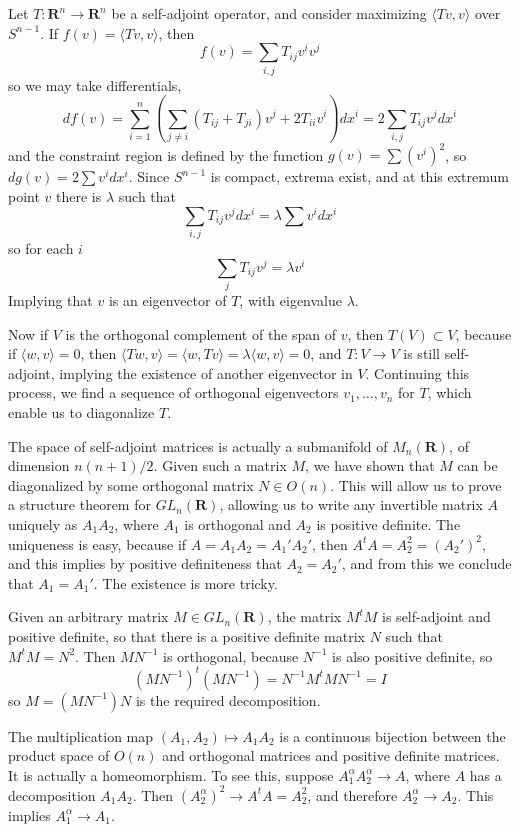 \begin{example}
    Let $T: \mathbf{R}^n \to \mathbf{R}^n$ be a self-adjoint operator, and consider maximizing $\langle Tv, v \rangle$ over $S^{n-1}$. If $f(v) = \langle Tv, v \rangle$, then
    \[ f(v) = \sum_{i,j} T_{ij} v^i v^j \]
    so we may take differentials,
    \[ df(v) = \sum_{i = 1}^n \left( \sum_{j \neq i} (T_{ij} + T_{ji}) v^j + 2 T_{ii} v^i \right) dx^i = 2 \sum_{i,j} T_{ij} v^j dx^i \]
    and the constraint region is defined by the function $g(v) = \sum (v^i)^2$, so $dg(v) = 2 \sum v^i dx^i$. Since $S^{n-1}$ is compact, extrema exist, and at this extremum point $v$ there is $\lambda$ such that
    \[ \sum_{i,j} T_{ij} v^j dx^i = \lambda \sum v^i dx^i \]
    so for each $i$
    \[ \sum_{j} T_{ij} v^j = \lambda v^i \]
    Implying that $v$ is an eigenvector of $T$, with eigenvalue $\lambda$.

    Now if $V$ is the orthogonal complement of the span of $v$, then $T(V) \subset V$, because if $\langle w, v \rangle = 0$, then $\langle Tw, v \rangle = \langle w, Tv \rangle = \lambda \langle w, v \rangle = 0$, and $T: V \to V$ is still self-adjoint, implying the existence of another eigenvector in $V$. Continuing this process, we find a sequence of orthogonal eigenvectors $v_1, \dots, v_n$ for $T$, which enable us to diagonalize $T$.

    The space of self-adjoint matrices is actually a submanifold of $M_n(\mathbf{R})$, of dimension $n(n+1)/2$. Given such a matrix $M$, we have shown that $M$ can be diagonalized by some orthogonal matrix $N \in O(n)$. This will allow us to prove a structure theorem for $GL_n(\mathbf{R})$, allowing us to write any invertible matrix $A$ uniquely as $A_1 A_2$, where $A_1$ is orthogonal and $A_2$ is positive definite. The uniqueness is easy, because if $A = A_1 A_2 = A_1' A_2'$, then $A^t A = A_2^2 = (A_2')^2$, and this implies by positive definiteness that $A_2 = A_2'$, and from this we conclude that $A_1 = A_1'$. The existence is more tricky.

    Given an arbitrary matrix $M \in GL_n(\mathbf{R})$, the matrix $M^t M$ is self-adjoint and positive definite, so that there is a positive definite matrix $N$ such that $M^t M = N^2$. Then $MN^{-1}$ is orthogonal, because $N^{-1}$ is also positive definite, so
    \[ (MN^{-1})^t (MN^{-1}) = N^{-1} M^t M N^{-1} = I \]
    so $M = (MN^{-1}) N$ is the required decomposition.

    The multiplication map $(A_1, A_2) \mapsto A_1 A_2$ is a continuous bijection between the product space of $O(n)$ and orthogonal matrices and positive definite matrices. It is actually a homeomorphism. To see this, suppose $A^\alpha_1 A^\alpha_2 \to A$, where $A$ has a decomposition $A_1 A_2$. Then $(A^\alpha_2)^2 \to A^t A = A_2^2$, and therefore $A_2^\alpha \to A_2$. This implies $A_1^\alpha \to A_1$.


\end{example}
